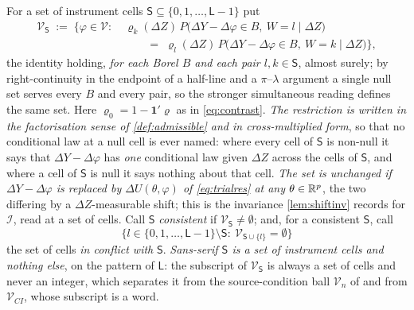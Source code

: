 \begin{definition}\label{def:cellsets}
For a set of instrument cells $\mathsf S\subseteq\{0,1,\dots,\mathsf L-1\}$ put
\[
\begin{aligned}
\mathcal V_{\mathsf S}\;:=\;\Big\{\varphi\in\mathcal V:\ &\varrho_k(\Delta Z)\,P\big(\Delta Y-\Delta\varphi\in B,\ W=l\mid\Delta Z\big)\\[-2pt]
&\qquad=\;\varrho_l(\Delta Z)\,P\big(\Delta Y-\Delta\varphi\in B,\ W=k\mid\Delta Z\big)\Big\},
\end{aligned}
\]
the identity holding, \emph{for each Borel $B$ and each pair $l,k\in\mathsf S$}, almost surely; by
right-continuity in the endpoint of a half-line and a $\pi$--$\lambda$ argument a single null set serves
every $B$ and every pair, so the stronger simultaneous reading defines the same set. Here
$\varrho_0=1-\mathbf 1'\varrho$ as in \eqref{eq:contrast}. \emph{The restriction is written in the
factorisation sense of \cref{def:admissible} and in cross-multiplied form}, so that no conditional law
at a null cell is ever named: where every cell of $\mathsf S$ is
non-null it says that $\Delta Y-\Delta\varphi$ has \emph{one} conditional law given $\Delta Z$ across the
cells of $\mathsf S$, and where a cell of $\mathsf S$ is null it says nothing about that cell.
\emph{The set is unchanged if $\Delta Y-\Delta\varphi$ is replaced by $\Delta U(\theta,\varphi)$ of
\eqref{eq:trialres} at any $\theta\in\mathbb{R}^{p}$}, the two differing by a $\Delta Z$-measurable shift; this
is the invariance \cref{lem:shiftinv} records for $\mathcal I$, read at a set of cells. Call
$\mathsf S$ \emph{consistent} if $\mathcal V_{\mathsf S}\neq\emptyset$; and, for a consistent
$\mathsf S$, call
\[
\big\{l\in\{0,1,\dots,\mathsf L-1\}\setminus\mathsf S:\ \mathcal V_{\mathsf S\cup\{l\}}=\emptyset\big\}
\]
the set of cells \emph{in conflict with} $\mathsf S$. \emph{Sans-serif $\mathsf S$ is a set of instrument
cells and nothing else}, on the pattern of $\mathsf L$: the subscript of $\mathcal V_{\mathsf S}$ is
always a set of cells and never an integer, which separates it from the source-condition ball
$\mathcal V_n$ of  and from $\mathcal V_{CI}$, whose subscript is a word.
\end{definition}

